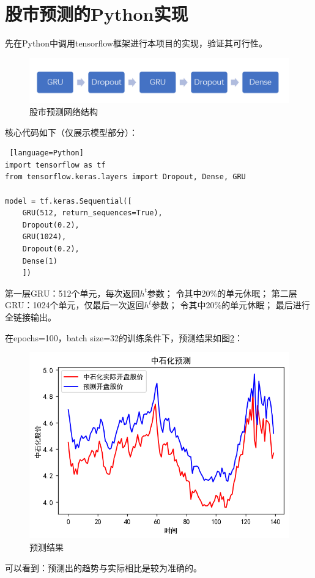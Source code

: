 \documentclass{jnuthesis}
\begin{document}
\section{股市预测的Python实现}


先在Python中调用tensorflow框架进行本项目的实现，验证其可行性。

\begin{figure}[H]
	\centering
	\includegraphics[width=1\linewidth]{pic/screenshot004}
	\caption{股市预测网络结构}
	\label{fig:screenshot004}
\end{figure}

核心代码如下（仅展示模型部分）：
\begin{lstlisting} [language=Python]
import tensorflow as tf
from tensorflow.keras.layers import Dropout, Dense, GRU

model = tf.keras.Sequential([   
	GRU(512, return_sequences=True),
	Dropout(0.2),
	GRU(1024),
	Dropout(0.2),
	Dense(1)
	])
\end{lstlisting}


 第一层GRU：512个单元，每次返回$ h^t $参数；
 令其中20\%的单元休眠；
 第二层GRU：1024个单元，仅最后一次返回$ h^t $参数；
 令其中20\%的单元休眠；
 最后进行全链接输出。

在epochs=100，batch size=32的训练条件下，预测结果如图\ref{fig:screenshot005}：
\begin{figure}[H]
	\centering
	\includegraphics[width=0.7\linewidth]{pic/screenshot005}
	\caption{预测结果}
	\label{fig:screenshot005}
\end{figure}

可以看到：预测出的趋势与实际相比是较为准确的。
\end{document}
